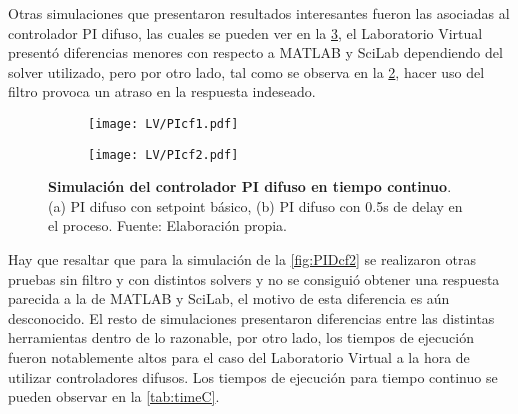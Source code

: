         Otras simulaciones que presentaron resultados interesantes fueron las asociadas al controlador PI difuso, las cuales se pueden ver en la \cref{fig:PIdifuso}, el Laboratorio Virtual presentó diferencias menores con respecto a MATLAB y SciLab dependiendo del solver utilizado, pero por otro lado, tal como se observa en la \cref{fig:PIf2}, hacer uso del filtro provoca un atraso en la respuesta indeseado. 

        \begin{figure}[htb]
            \centering
            \begin{subfigure}[t]{0.49\textwidth}
                \centering
                \texttt{[image: LV/PIcf1.pdf]}
                \caption{}
                \label{fig:PIf1}
            \end{subfigure}
            \hfill
            \begin{subfigure}[t]{0.49\textwidth}
                \centering
                \texttt{[image: LV/PIcf2.pdf]}
                \caption{}
                \label{fig:PIf2}
            \end{subfigure}
            \caption[Simulación del controlador PI difuso en tiempo continuo]{\textbf{Simulación del controlador PI difuso en tiempo continuo}. (a) PI difuso con setpoint básico, (b) PI difuso con 0.5s de delay en el proceso. Fuente: Elaboración propia. \label{fig:PIdifuso}}
        \end{figure}

        Hay que resaltar que para la simulación de la \cref{fig:PIDcf2} se realizaron otras pruebas sin filtro y con distintos solvers y no se consiguió obtener una respuesta parecida a la de MATLAB y SciLab, el motivo de esta diferencia es aún desconocido. El resto de simulaciones presentaron diferencias entre las distintas herramientas dentro de lo razonable, por otro lado, los tiempos de ejecución fueron notablemente altos para el caso del Laboratorio Virtual a la hora de utilizar controladores difusos. Los tiempos de ejecución para tiempo continuo se pueden observar en la \cref{tab:timeC}.

